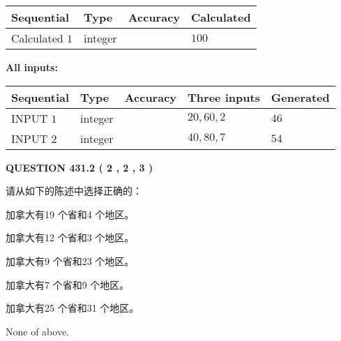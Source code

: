 \documentclass{ctexart}
\begin{document}
   
   
   
\noindent{}
   
   
  
  
\noindent\begin{tabular}{|l|l|l|l|}
\hline
 Sequential & Type & Accuracy & Calculated \\ 
\hline
 
 
  Calculated $  1 $ & integer &  & 
  $ 100 $ 
 \\  \hline  
 \end{tabular}
   
   
   
   
\noindent\vspace{0.1in}\hspace{-0.08in} {\textbf{\Large{All inputs: }}}
   
   
  
  
\noindent\begin{tabular}{|l|l|l|l|l|}
\hline
 Sequential & Type & Accuracy & Three inputs & Generated \\ 
\hline
 
 
  INPUT $  1 $ & integer &  & $
 20
 , 
 60
 , 
 2
 $ & $ 46 $ 
 \\  \hline  
 
 
  INPUT $  2 $ & integer &  & $
 40
 , 
 80
 , 
 7
 $ & $ 54 $ 
 \\  \hline  
 \end{tabular}
   
   
  
\vspace{0.2in}
  
{\textbf{\Large{QUESTION
431.2 
 ( 2 , 2 , 3 )
}}}
  
  
请从如下的陈述中选择正确的：
 
 
加拿大有19 个省和4 个地区。
 
 
加拿大有12 个省和3 个地区。
 
 
加拿大有9 个省和23 个地区。
 
 
加拿大有7 个省和9 个地区。
 
 
加拿大有25 个省和31 个地区。
 
 
 None of above.
 
 
\noindent{}
 
\end{document}
